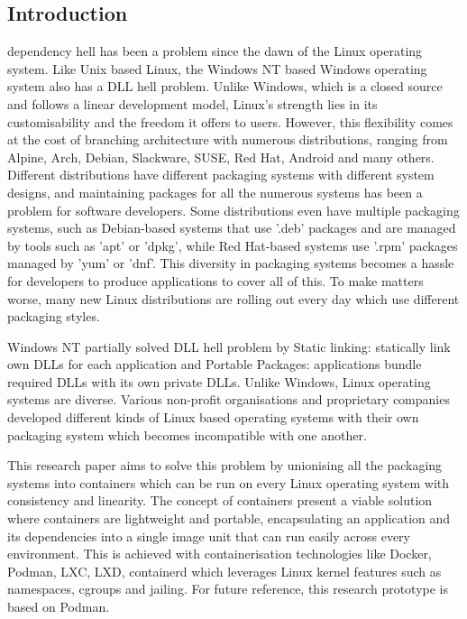 \documentclass[journal,onecolumn]{IEEEtran}
\begin{document}
\subsection{Introduction}
 dependency hell has been a problem since the dawn of the Linux operating system. Like Unix based Linux, the Windows NT based Windows operating system also has a DLL hell problem. Unlike Windows, which is a closed source and follows a linear development model, Linux's strength lies in its customisability and the freedom it offers to users. However, this flexibility comes at the cost of branching architecture with numerous distributions, ranging from Alpine, Arch, Debian, Slackware, SUSE, Red Hat, Android and many others. Different distributions have different packaging systems with different system designs, and maintaining packages for all the numerous systems has been a problem for software developers. Some distributions even have multiple packaging systems, such as Debian-based systems that use '.deb' packages and are managed by tools such as 'apt' or 'dpkg', while Red Hat-based systems use '.rpm' packages managed by 'yum' or 'dnf'. This diversity in packaging systems becomes a hassle for developers to produce applications to cover all of this. To make matters worse, many new Linux distributions are rolling out every day which use different packaging styles. 

Windows NT partially solved DLL hell problem by Static linking: statically link own DLLs for each application and Portable Packages: applications bundle required DLLs with its own private DLLs. Unlike Windows, Linux operating systems are diverse. Various non-profit organisations and proprietary companies developed different kinds of Linux based operating systems with their own packaging system which becomes incompatible with one another. 

This research paper aims to solve this problem by unionising all the packaging systems into containers which can be run on every Linux operating system with consistency and linearity. The concept of containers present a viable solution where containers are lightweight and portable, encapsulating an application and its dependencies into a single image unit that can run easily across every environment. This is achieved with containerisation technologies like Docker, Podman, LXC, LXD, containerd which leverages Linux kernel features such as namespaces, cgroups and jailing. For future reference, this research prototype is based on Podman. 
\end{document}
